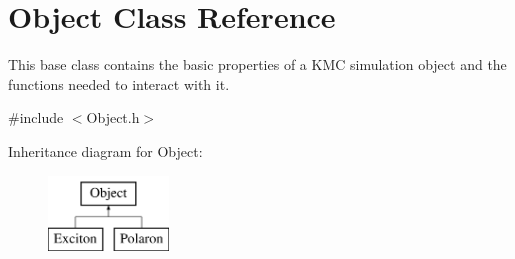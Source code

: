 \hypertarget{class_object}{}\section{Object Class Reference}
\label{class_object}


This base class contains the basic properties of a K\+MC simulation object and the functions needed to interact with it.  




{\ttfamily \#include $<$Object.\+h$>$}

Inheritance diagram for Object\+:\begin{figure}[H]
\begin{center}
\leavevmode
\includegraphics[height=2.000000cm]{class_object}
\end{center}
\end{figure}

